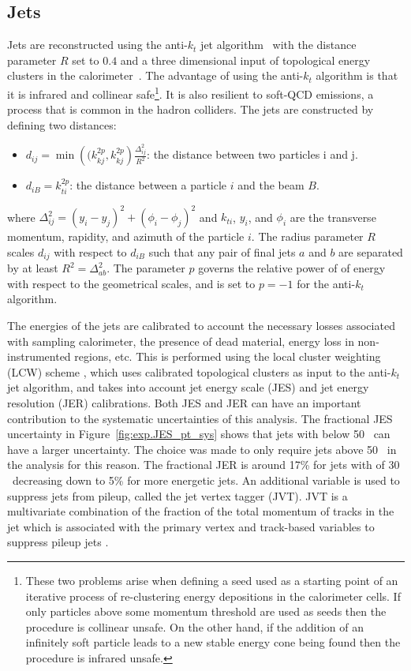 \subsection{Jets}
Jets are reconstructed using the anti-$k_{t}$ jet algorithm~\cite{Cacciari:2008gp} 
with the distance parameter $R$ set to $0.4$ and 
a three dimensional input of topological energy clusters in the 
calorimeter~\cite{PERF-2014-07}. 
The advantage of using the anti-$k_{t}$ algorithm is that it is infrared
 and collinear safe\footnote{These two problems arise when defining a seed used 
as a starting point of an iterative process of re-clustering energy 
depositions in the calorimeter cells.
If only particles above some momentum threshold are used as seeds then the 
procedure is collinear unsafe. On the other hand, if the addition of an 
infinitely soft particle leads to a new stable energy cone being found then 
the procedure is infrared unsafe.
}.
It is also resilient to soft-QCD emissions, a process that is common in the hadron colliders.
The jets are constructed by defining two distances:
\begin{itemize}
\item $d_{ij} = \min\left((k_{kj}^{2p},k_{kj}^{2p}\right)\frac{\Delta_{ij}^2}{R^2}$: the distance between two particles i and j.
\item $d_{iB} = k_{ti}^{2p}$: the distance between a particle $i$ and the beam $B$.
\end{itemize}
where $\Delta_{ij}^2 = \left( y_i - y_j\right)^2 + \left(\phi_i - \phi_j\right)^2$ and $k_{ti}$, $y_i$, and $\phi_i$ are the transverse momentum, rapidity, and azimuth of the 
particle $i$. The radius parameter $R$ scales $d_{ij}$ with respect to $d_{iB}$ such that any pair of final jets $a$ and $b$ are separated by at least $R^2=\Delta_{ab}^2$.
The parameter $p$ governs the relative power of of energy with respect to the geometrical scales, and is set to $p=-1$ for the anti-$k_{t}$ algorithm.


The energies of the jets are calibrated to  account the necessary losses associated with sampling calorimeter,
the presence of dead material,  energy loss in non-instrumented regions, etc. This is performed using the local cluster weighting
(LCW) scheme \cite{Aad:2016upyew}, which uses calibrated topological clusters as input to the anti-$k_{t}$ jet algorithm,
and takes into account jet energy scale (JES) and jet energy resolution (JER) calibrations.
Both JES and JER can have an important contribution to the systematic uncertainties of this analysis.
The fractional JES uncertainty in Figure~\ref{fig:exp.JES_pt_sys} shows that jets with \pt below 50 \GeV~can have a larger uncertainty.
The choice was made to only require jets above 50 \GeV~in the analysis for this reason.
The fractional JER is around 17\% for jets with \pt of 30 \GeV~decreasing down to 5\% for more energetic jets.
An additional variable is used to suppress jets from pileup, called the jet vertex tagger (JVT).
JVT is a multivariate combination of the fraction of the total momentum of tracks in the jet which is associated with the primary vertex
and  track-based variables to suppress pileup jets \cite{ATL-PHYS-PUB-2015-034}. 

